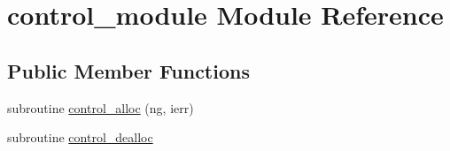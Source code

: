 \hypertarget{classcontrol__module}{\section{control\-\_\-module Module Reference}
\label{classcontrol__module}
}
\subsection*{Public Member Functions}
\begin{DoxyCompactItemize}
\item 
subroutine \hyperlink{classcontrol__module_ac6bb07f4107c0d12f193aebfb73e233f}{control\-\_\-alloc} (ng, ierr)
\item 
subroutine \hyperlink{classcontrol__module_a2f968e7fae2c9dab97d81d4e8db154c8}{control\-\_\-dealloc}
\end{DoxyCompactItemize}
